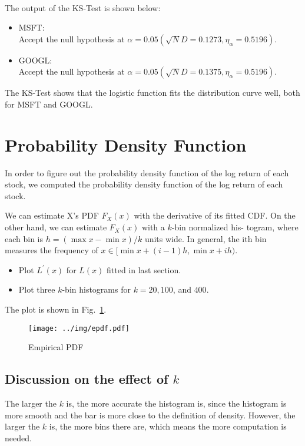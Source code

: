 \documentclass[runningheads]{llncs}
\begin{document}
\hfill\\
The output of the KS-Test is shown below:

\begin{itemize}
    \item MSFT:\\
    Accept the null hypothesis at $\alpha=0.05 (\sqrt{N}D=0.1273,\eta_{\alpha}=0.5196)$.
    \item GOOGL:\\
    Accept the null hypothesis at $\alpha=0.05 (\sqrt{N}D=0.1375,\eta_{\alpha}=0.5196)$.
\end{itemize}

\noindent The KS-Test shows that the logistic function fits the distribution curve well, both for MSFT and GOOGL.

\section{Probability Density Function}

In order to figure out the probability density function of the log return of each stock, we computed the probability density function of the log return of each stock.

We can estimate X's PDF $F_X(x)$ with the derivative of its fitted
CDF. On the other hand, we can estimate $F_X(x)$ with a $k$-bin normalized his-
togram, where each bin is $h = (\max x - \min x)/k$ units wide. In general, the
ith bin measures the frequency of $x \in [\min x + (i - 1)h, \min x + ih)$.

\begin{itemize}
    \item Plot $L^{'}(x)$ for $L(x)$ fitted in last section.
    \item Plot three $k$-bin histograms for $k = 20, 100$, and $400$.
\end{itemize}

The plot is shown in Fig.~\ref{fig:epdf}.
\begin{figure}
    \centering
    \texttt{[image: ../img/epdf.pdf]}
    \caption{Empirical PDF}
    \label{fig:epdf}
\end{figure}

\subsection{Discussion on the effect of $k$}

The larger the $k$ is, the more accurate the histogram is, since the histogram is more smooth and the bar is more close to the definition of density.
However, the larger the $k$ is, the more bins there are, which means the more computation is needed.
\end{document}
